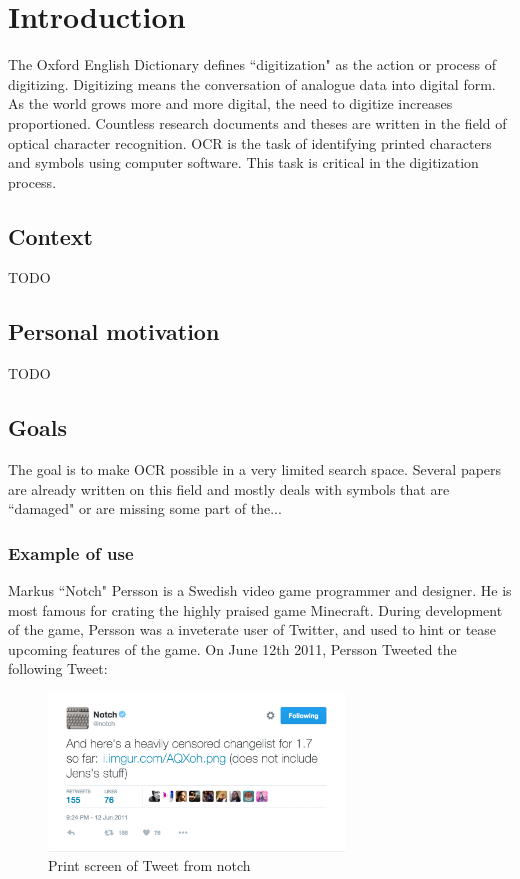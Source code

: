 
\chapter{Introduction}
The Oxford English Dictionary defines ``digitization" as the action or process of digitizing. Digitizing means the conversation of analogue data into digital form\cite{oed-digitization}. As the world grows more and more digital, the need to digitize increases proportioned. Countless research documents and theses are written in the field of optical character recognition. OCR is the task of identifying printed characters and symbols using computer software. This task is critical in the digitization process.

\section{Context}
TODO

\section{Personal motivation}
TODO

\section{Goals}
The goal is to make OCR possible in a very limited search space. Several papers are already written on this field and mostly deals with symbols that are ``damaged" or are missing some part of the...

\subsection{Example of use}
Markus ``Notch" Persson is a Swedish video game programmer and designer. He is most famous for crating the highly praised game Minecraft. During development of the game, Persson was a inveterate user of Twitter, and used to hint or tease upcoming features of the game. On June 12th 2011, Persson Tweeted the following Tweet:

\begin{figure}[h]
    \centering
    \includegraphics[width=0.7\textwidth]{fig/chapter1/notch_tweet.png}
    \caption{Print screen of Tweet from notch\footnotemark}
\end{figure}

